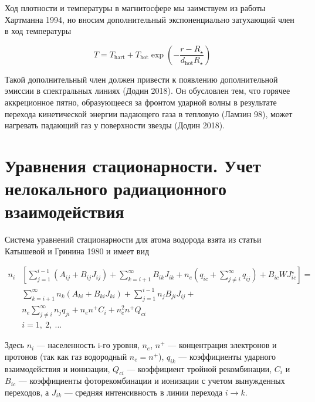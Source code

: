 \documentclass{article}
\begin{document}
Ход плотности и температуры в магнитосфере мы заимствуем из работы Хартманна 1994, но вносим дополнительный экспоненциально затухающий член в ход температуры

\begin{equation} \label{eq:temp}
 T = T_{\text{hart}} + T_\text{hot}\exp\left(-\frac{r - R_\star}{d_\text{hot} R_\star}\right)
\end{equation}

Такой дополнительный член должен привести к появлению дополнительной эмиссии в спектральных линиях (Додин 2018). Он обусловлен тем, что горячее аккреционное пятно, образующееся за фронтом ударной волны в результате перехода кинетической энергии падающего газа в тепловую (Ламзин 98),
 может нагревать падающий газ у поверхности звезды (Додин 2018).


\section{Уравнения стационарности. Учет нелокального радиационного взаимодействия}

Система уравнений стационарности для атома водорода взята из статьи Катышевой и Гринина 1980 и имеет вид

 
\begin{align} \label{eq:stat}
n_i & \left[ \sum\limits_{j=1}^{i-1} (A_{ij} + B_{ij}J_{ij}) + \sum\limits_{k=i+1}^\infty B_{ik}J_{ik} + n_e ( q_{ic} + \sum\limits_{j \neq i}^\infty q_{ij} ) + B_{ic}WJ_{ic}^\star \right] = \nonumber \\
 & \sum\limits_{k=i+1}^\infty n_k (A_{ki} + B_{ki}J_{ki}) + \sum\limits_{j=1}^{i-1} n_jB_{ji}J_{ij} + \nonumber \\
 & n_e \sum\limits_{j\neq i}^\infty n_jq_{ji} + n_en^+C_i + n_e^2n^+Q_{ci} \\
 & i=1,\ 2,\ ... \nonumber
\end{align}

Здесь $n_i$ --- населенность i-го уровня, $n_e$, $n^+$ --- концентрация электронов и протонов (так как газ водородный $n_e = n^+$), $q_{ik}$ --- коэффициенты ударного взаимодействия и ионизации, $Q_{ci}$ --- коэффициент тройной рекомбинации, $C_i$ и $B_{ic}$ --- коэффициенты фоторекомбинации и ионизации с учетом вынужденных переходов, а $J_{ik}$ --- средняя интенсивность в линии перехода $i\rightarrow k$.  
\end{document}

